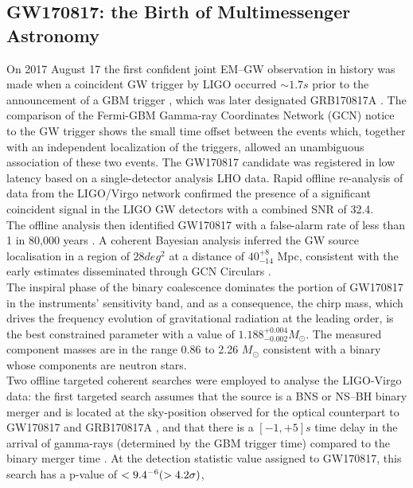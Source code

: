 \documentclass[binding=0.6cm, LaM]{sapthesis}
\begin{document}
\subsection{GW170817: the Birth of Multimessenger Astronomy}

	On 2017 August 17 the first confident joint EM–GW observation in history was made when 
	a coincident GW trigger by LIGO occurred $\sim1.7s$ prior to the announcement of a GBM trigger \cite{147},
	which was later designated GRB170817A \cite{140}.
	The comparison of the Fermi-GBM Gamma-ray Coordinates Network (GCN) notice to the GW 
	trigger shows the small time offset between the events which, together with an independent localization of the triggers,
	allowed an unambiguous association of these two events. 
	The GW170817 candidate was registered in low latency \cite{112,114}
	based on a single-detector analysis LHO data. 
	Rapid offline re-analysis \cite{28,111} of data from the LIGO/Virgo network 
	confirmed the presence of a significant coincident signal in the LIGO GW detectors with a combined SNR of 32.4. \\
	The offline analysis then identified GW170817 with a false-alarm rate of less than 1 in 80,000 years \cite{61}. 
	A coherent Bayesian analysis \cite{59,152}
	inferred the GW source localisation in a region of $28 deg^2$ at a distance of $40^{+8}_{-14}$ Mpc, 
	consistent with the early estimates disseminated through GCN Circulars \cite{55,60}. \\ 
	The inspiral phase of the binary coalescence dominates 
	the portion of GW170817 in the instruments’ sensitivity band, 
	and as a consequence, the chirp mass, which drives the frequency evolution of gravitational radiation at the leading order, 
	is the best constrained parameter with a value of $1.188^{+0.004}_{-0.002}M_\odot$.
	The measured component masses are in the range 0.86 to 2.26 $M_\odot$
	consistent with a binary whose components are neutron stars. \\
	Two offline targeted coherent searches were employed to analyse the LIGO-Virgo data: 
	the first targeted search \cite{111,116,213}
	assumes that the source is a BNS or NS–BH binary merger and is located at the sky-position 
	observed for the optical counterpart to GW170817 and GRB170817A \cite{55,136}, 
	and that there is a $[-1, +5] s$ time delay in the arrival of gamma-rays (determined by the GBM trigger time) 
	compared to the binary merger time \cite{55}. 
	At the detection statistic value assigned to GW170817, this search has a p-value of $<9.4\time 10^{-6}(>4.2\sigma)$, 
\end{document}

